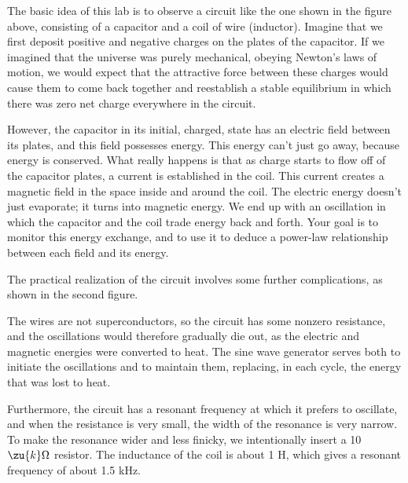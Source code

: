 \label{lab:energy-in-fields}

\apparatus
{}


\introduction

The basic idea of this lab is to observe a circuit like the one shown in
the figure above, consisting of a capacitor and a coil of wire (inductor).
Imagine that we first deposit positive and negative
charges on the plates of the capacitor. If we imagined that the universe was
purely mechanical, obeying Newton's laws of motion,
we would expect that the attractive force between these charges
would cause them to come back together and reestablish a stable equilibrium
in which there was zero net charge everywhere in the circuit.

However, the capacitor in its initial, charged, state has an electric 
field between its plates, and this field possesses energy. This energy
can't just go away, because energy is conserved. What really happens is
that as charge starts to flow off of the capacitor plates, a current is
established in the coil. This current creates a magnetic field in the space
inside and around the coil. The electric energy doesn't just evaporate;
it turns into magnetic energy. We end up with an oscillation in which the
capacitor and the coil trade energy back and forth. Your goal is to
monitor this energy exchange, and to use it to deduce a power-law
relationship between each field and its energy.

The practical realization of the circuit involves some further
complications, as shown in the second figure. 

The wires are not superconductors, so the circuit
has some nonzero resistance, and the oscillations would therefore
gradually die out, as the electric and magnetic energies were
converted to heat. The sine wave generator serves both to
initiate the oscillations and to maintain them, replacing, in each cycle, the
energy that was lost to heat. 

Furthermore, the circuit has a resonant frequency at which it
prefers to oscillate, and when the resistance is very small,
the width of the resonance is very narrow. To make the
resonance wider and less finicky, we intentionally insert
a 10 $\zu{k}\Omega$ resistor. The inductance of the coil is about 1 H, which
gives a resonant frequency of about 1.5 kHz.


